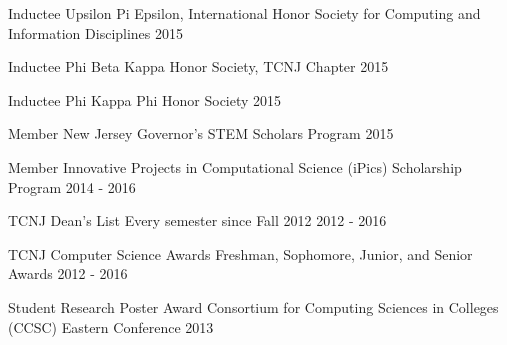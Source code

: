 
\begin{cvhonors}

  \cvhonor
    {Inductee} %
    {Upsilon Pi Epsilon, International Honor Society for Computing and Information Disciplines} %
    {2015} %

  \cvhonor
    {Inductee} %
    {Phi Beta Kappa Honor Society, TCNJ Chapter} %
    {2015} %

  \cvhonor
    {Inductee} %
    {Phi Kappa Phi Honor Society} %
    {2015} %

  \cvhonor
    {Member} %
    {New Jersey Governor's STEM Scholars Program} %
    {2015} %

  \cvhonor
    {Member} %
    {Innovative Projects in Computational Science (iPics) Scholarship Program} %
    {2014 - 2016} %

  \cvhonor
    {TCNJ Dean's List} %
    {Every semester since Fall 2012} %
    {2012 - 2016} %



  \cvhonor
    {TCNJ Computer Science Awards} %
    {Freshman, Sophomore, Junior, and Senior Awards} %
    {2012 - 2016} %

  \cvhonor
    {Student Research Poster Award} %
    {Consortium for Computing Sciences in Colleges (CCSC) Eastern Conference} %
    {2013} %

\end{cvhonors}
